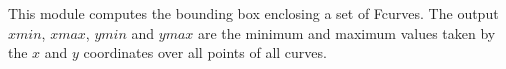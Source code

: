This module computes the bounding box enclosing a set of Fcurves. The output
$xmin$, $xmax$, $ymin$ and $ymax$ are the minimum and maximum
values taken by the $x$ and $y$ coordinates over all points of all curves.
